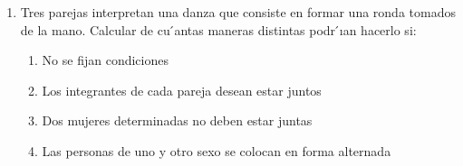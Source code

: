 \documentclass[a4paper]{article}
\newcommand{\exercise}{\item}
\begin{document}
\begin{enumerate}
\begin{enumerate} [label=(\alph*)]
		\item ¿Cuántos números distintos de 5 cifras y mayores que $10^4$ se pueden formar con las cifras 2, 7, y 0, si el 2 y el 7 se repiten 2 veces 
		\item ¿Cuántos números distintos de 3 cifras pueden formarse con los dígitos del 1 al 8, si estos pueden repetirse?
	\end{enumerate}
	\exercise Tres parejas interpretan una danza que consiste en formar una ronda tomados de la mano. Calcular de cu ́antas maneras distintas podr ́ıan hacerlo si:
	\begin{enumerate} [label=(\alph*)]
		\item No se fijan condiciones
		\item Los integrantes de cada pareja desean estar juntos
		\item Dos mujeres determinadas no deben estar juntas
		\item Las personas de uno y otro sexo se colocan en forma alternada
	\end{enumerate}
\end{enumerate}
\vspace{20pt} 
\end{document}
